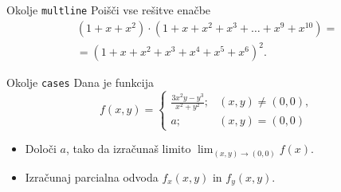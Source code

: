 \begin{frame}{Okolje \texttt{multline}}
	Poišči vse rešitve enačbe
	\begin{multline*}
	(1+x+x^2) \cdot (1+x+x^2+x^3+\ldots+x^9+x^{10}) = \\
	=(1+x+x^2+x^3+x^4+x^5+x^6)^2.
	\end{multline*}
\end{frame}

\begin{frame}{Okolje \texttt{cases}}
	Dana je funkcija
	$$
		f(x,y) = \begin{cases}
			\frac{3x^2y-y^3}{x^2+y^2}; & (x, y)  \ne (0,0), \\
			a; & (x, y) = (0,0)
		\end{cases}
	$$	
	\begin{itemize}
	\item Določi $a$, tako da izračunaš limito \( \lim_{(x,y)\to(0,0)} f(x). \)
	\item Izračunaj parcialna odvoda $f_x(x,y)$ in $f_y(x,y)$.
	\end{itemize}
\end{frame}
